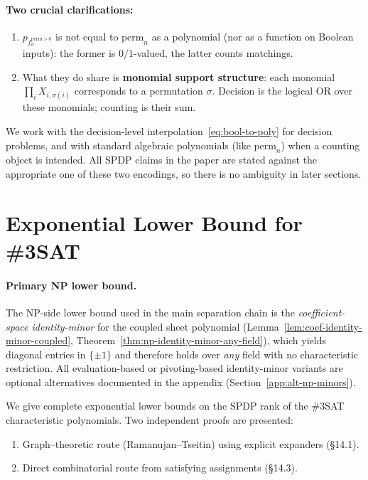 \documentclass[12pt]{article}
\theoremstyle{definition}
\theoremstyle{definition}
\theoremstyle{remark}
\theoremstyle{remark}
\begin{document}
\paragraph{Two crucial clarifications:}
\begin{enumerate}
\item $p_{f_n^{\mathrm{perm}>0}}$ is not equal to $\mathrm{perm}_n$ as a polynomial (nor as a function on Boolean inputs): the former is $0/1$-valued, the latter counts matchings.

\item What they do share is \textbf{monomial support structure}: each monomial $\prod_i X_{i,\sigma(i)}$ corresponds to a permutation $\sigma$. Decision is the logical OR over these monomials; counting is their sum.
\end{enumerate}

We work with the decision-level interpolation~\eqref{eq:bool-to-poly} for decision problems, and with standard algebraic polynomials (like $\mathrm{perm}_n$) when a counting object is intended. All SPDP claims in the paper are stated against the appropriate one of these two encodings, so there is no ambiguity in later sections.

\section{Exponential Lower Bound for \#3SAT}
\label{sec:3sat-lower-bound}

\paragraph{Primary NP lower bound.}
The NP-side lower bound used in the main separation chain is the
\emph{coefficient-space identity-minor} for the coupled sheet polynomial
(Lemma~\ref{lem:coef-identity-minor-coupled}, Theorem~\ref{thm:np-identity-minor-any-field}),
which yields diagonal entries in $\{\pm 1\}$ and therefore holds over \emph{any} field
with no characteristic restriction.
All evaluation-based or pivoting-based identity-minor variants are optional
alternatives documented in the appendix (Section~\ref{app:alt-np-minors}).

\medskip
We give complete exponential lower bounds on the SPDP rank of the \#3SAT characteristic polynomials. Two independent proofs are presented:
\begin{enumerate}
\item Graph--theoretic route (Ramanujan--Tseitin) using explicit expanders (\S14.1).
\item Direct combinatorial route from satisfying assignments (\S14.3).
\end{enumerate}
\end{document}
